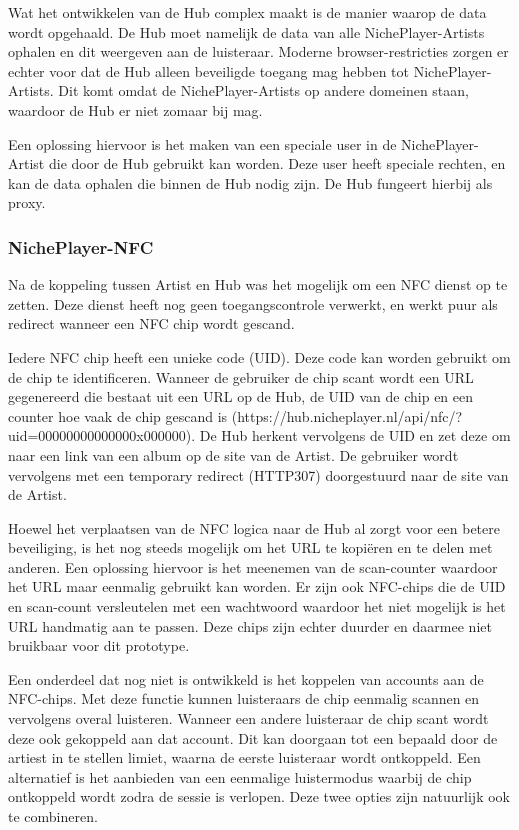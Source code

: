 Wat het ontwikkelen van de Hub complex maakt is de manier waarop de data wordt opgehaald. De Hub moet namelijk de data van alle NichePlayer-Artists ophalen en dit weergeven aan de luisteraar. Moderne browser-restricties zorgen er echter voor dat de Hub alleen beveiligde toegang mag hebben tot NichePlayer-Artists. Dit komt omdat de NichePlayer-Artists op andere domeinen staan, waardoor de Hub er niet zomaar bij mag.

Een oplossing hiervoor is het maken van een speciale user in de NichePlayer-Artist die door de Hub gebruikt kan worden. Deze user heeft speciale rechten, en kan de data ophalen die binnen de Hub nodig zijn. De Hub fungeert hierbij als proxy.

\subsubsection*{NichePlayer-NFC}
Na de koppeling tussen Artist en Hub was het mogelijk om een NFC dienst op te zetten. Deze dienst heeft nog geen toegangscontrole verwerkt, en werkt puur als redirect wanneer een NFC chip wordt gescand.

Iedere NFC chip heeft een unieke code (UID). Deze code kan worden gebruikt om de chip te identificeren. Wanneer de gebruiker de chip scant wordt een URL gegenereerd die bestaat uit een URL op de Hub, de UID van de chip en een counter hoe vaak de chip gescand is (https://hub.nicheplayer.nl/api/nfc/?uid=00000000000000x000000). De Hub herkent vervolgens de UID en zet deze om naar een link van een album op de site van de Artist. De gebruiker wordt vervolgens met een temporary redirect (HTTP307) doorgestuurd naar de site van de Artist.

Hoewel het verplaatsen van de NFC logica naar de Hub al zorgt voor een betere beveiliging, is het nog steeds mogelijk om het URL te kopiëren en te delen met anderen. Een oplossing hiervoor is het meenemen van de scan-counter waardoor het URL maar eenmalig gebruikt kan worden. Er zijn ook NFC-chips die de UID en scan-count versleutelen met een wachtwoord waardoor het niet mogelijk is het URL handmatig aan te passen. Deze chips zijn echter duurder en daarmee niet bruikbaar voor dit prototype.

Een onderdeel dat nog niet is ontwikkeld is het koppelen van accounts aan de NFC-chips. Met deze functie kunnen luisteraars de chip eenmalig scannen en vervolgens overal luisteren. Wanneer een andere luisteraar de chip scant wordt deze ook gekoppeld aan dat account. Dit kan doorgaan tot een bepaald door de artiest in te stellen limiet, waarna de eerste luisteraar wordt ontkoppeld. Een alternatief is het aanbieden van een eenmalige luistermodus waarbij de chip ontkoppeld wordt zodra de sessie is verlopen. Deze twee opties zijn natuurlijk ook te combineren.

